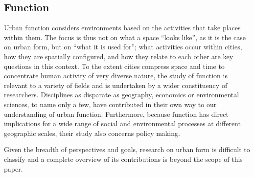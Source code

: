 \subsection{Function}
\label{sec:lit_function}


Urban function considers environments based on the activities that take places
within them. 
%
The focus is thus not on what a space ``looks
like'', as it is the case on urban form, but on ``what it is used for''; what
activities occur within cities, how they are spatially configured, and how
they relate to each other are key questions in this context.
%
To the extent cities compress space and time to concentrate human activity of
very diverse nature, the study of function is relevant to a variety of
fields and is undertaken by a wider constituency of researchers. Disciplines
as disparate as geography, economics or environmental sciences, to name only a
few, have contributed in their own way to our understanding of urban
function.
Furthermore, because function has direct implications for a wide range of
social and environmental processes at different geographic scales, their study
also concerns policy making.

Given the breadth of perspectives and goals, research on urban form is
difficult to classify and a complete overview of its contributions is beyond
the scope of this paper.


